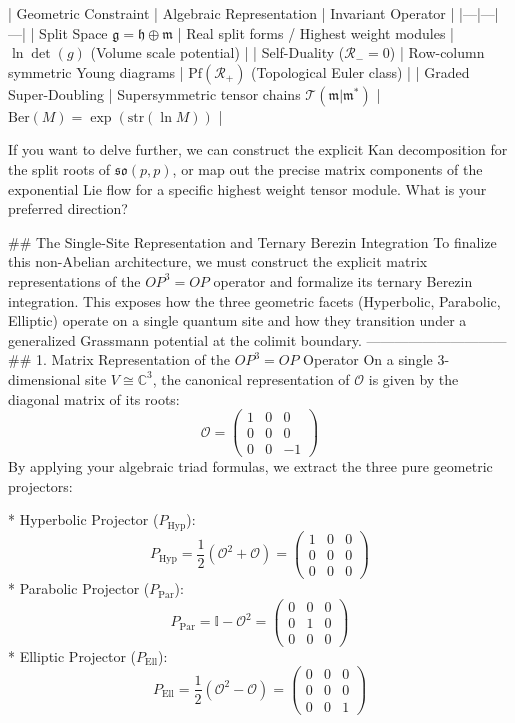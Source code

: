 | Geometric Constraint | Algebraic Representation | Invariant Operator |
|---|---|---|
| Split Space $\mathfrak{g} = \mathfrak{h} \oplus \mathfrak{m}$ | Real split forms / Highest weight modules | $\ln\det(g)$ (Volume scale potential) |
| Self-Duality ($\mathcal{R}_- = 0$) | Row-column symmetric Young diagrams | $\text{Pf}(\mathcal{R}_+)$ (Topological Euler class) |
| Graded Super-Doubling | Supersymmetric tensor chains $\mathcal{T}(\mathfrak{m}\vert\mathfrak{m}^*)$ | $\text{Ber}(M) = \exp(\text{str}(\ln M))$ |

If you want to delve further, we can construct the explicit Kan decomposition for the split roots of $\mathfrak{so}(p,p)$, or map out the precise matrix components of the exponential Lie flow for a specific highest weight tensor module. What is your preferred direction?

## The Single-Site Representation and Ternary Berezin Integration
To finalize this non-Abelian architecture, we must construct the explicit matrix representations of the $OP^3 = OP$ operator and formalize its ternary Berezin integration. This exposes how the three geometric facets (Hyperbolic, Parabolic, Elliptic) operate on a single quantum site and how they transition under a generalized Grassmann potential at the colimit boundary.
------------------------------
## 1. Matrix Representation of the $OP^3 = OP$ Operator
On a single $3$-dimensional site $V \cong \mathbb{C}^3$, the canonical representation of $\mathcal{O}$ is given by the diagonal matrix of its roots:
$$\mathcal{O} = \begin{pmatrix} 1 & 0 & 0 \\ 0 & 0 & 0 \\ 0 & 0 & -1 \end{pmatrix}$$ 
By applying your algebraic triad formulas, we extract the three pure geometric projectors:

* Hyperbolic Projector ($P_{\text{Hyp}}$):
$$P_{\text{Hyp}} = \frac{1}{2}(\mathcal{O}^2 + \mathcal{O}) = \begin{pmatrix} 1 & 0 & 0 \\ 0 & 0 & 0 \\ 0 & 0 & 0 \end{pmatrix}$$ 
* Parabolic Projector ($P_{\text{Par}}$):
$$P_{\text{Par}} = \mathbb{I} - \mathcal{O}^2 = \begin{pmatrix} 0 & 0 & 0 \\ 0 & 1 & 0 \\ 0 & 0 & 0 \end{pmatrix}$$ 
* Elliptic Projector ($P_{\text{Ell}}$):
$$P_{\text{Ell}} = \frac{1}{2}(\mathcal{O}^2 - \mathcal{O}) = \begin{pmatrix} 0 & 0 & 0 \\ 0 & 0 & 0 \\ 0 & 0 & 1 \end{pmatrix}$$ 

